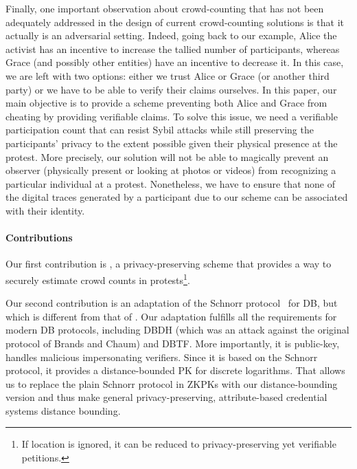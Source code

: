 Finally, one important observation about crowd-counting that has not been adequately addressed in the design of current crowd-counting solutions is that it actually is an adversarial setting. 
Indeed, going back to our example, Alice the activist has an incentive to increase the tallied number of participants, whereas Grace (and possibly other entities) have an incentive to decrease it.
In this case, we are left with two options: either we trust Alice or Grace (or another third party) or we have to be able to verify their claims ourselves.
In this paper, our main objective is to provide a scheme preventing both Alice 
and Grace from cheating by providing verifiable claims.
To solve this issue, we need a verifiable participation count that can resist Sybil attacks while still preserving the participants' privacy to the extent possible given their physical presence at the protest. 
More precisely, our solution will not be able to magically prevent an observer (physically present or looking at photos or videos) from recognizing a particular individual at a protest. 
Nonetheless, we have to ensure that none of the digital traces generated by a participant due to our scheme can be associated with their identity. %

\paragraph*{Contributions}

Our first contribution is \CROCUS, a privacy-preserving scheme that provides a 
way to securely estimate crowd counts in protests\footnote{%
  If location is ignored, it can be reduced to privacy-preserving yet 
  verifiable petitions.
}.

Our second contribution is an adaptation of the Schnorr protocol~\cite{Schnorr} for \ac{DB}, but which is different from that of \textcite{DistanceBounding}.
Our adaptation fulfills all the requirements for modern \ac{DB} protocols, 
including \ac{DBDH} (which was an attack against the original protocol of 
Brands and Chaum) and \ac{DBTF}.
More importantly, it is public-key, handles malicious impersonating verifiers.
Since it is based on the Schnorr protocol, it provides a distance-bounded 
\ac{PK} for discrete logarithms.
That allows us to replace the plain Schnorr protocol in \acp{ZKPK} with our 
distance-bounding version and thus make general privacy-preserving, 
attribute-based credential systems distance bounding.

